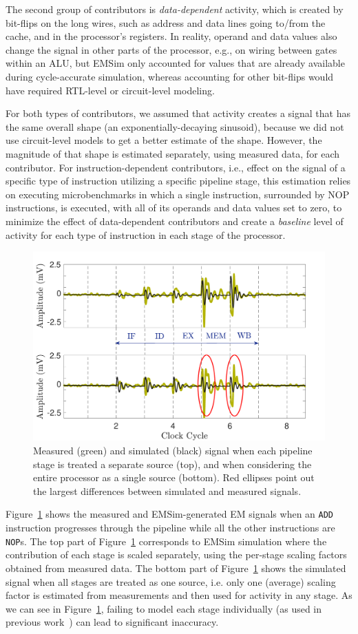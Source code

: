 The second group of contributors is \textit{data-dependent} activity, which is created by bit-flips on the long wires, such as address and data lines going to/from the cache, and in the processor's registers. In reality, operand and data values also change the signal in other parts of the processor, e.g., on wiring between gates within an ALU, but EMSim only accounted for values that are already available during cycle-accurate simulation, whereas accounting for other bit-flips would have required RTL-level or circuit-level modeling.

For both types of contributors, we assumed that activity creates a signal that has the same overall shape (an exponentially-decaying sinusoid), because we did not use circuit-level models to get a better estimate of the shape. However, the magnitude of that shape is estimated separately, using measured data, for each contributor. For instruction-dependent contributors, i.e., effect on the signal of a specific type of instruction utilizing a specific pipeline stage, this estimation relies on executing microbenchmarks in which a single instruction, surrounded by NOP instructions, is executed, with all of its operands and data values set to zero,
to minimize the effect of data-dependent contributors and create a \emph{baseline} level of activity for each type of instruction in each stage of the processor.

\begin{figure}
	\centering
\vspace{-0.2in}
	\includegraphics[width=0.45\columnwidth,clip]{figure/amp2.pdf}
\vspace{-0.3in}
	\caption{Measured (green) and simulated (black) signal when each pipeline stage is treated a separate source (top), and when considering the entire processor as a single source (bottom). Red ellipses point out the largest differences between simulated and measured signals.}
	\vspace{-0.1in}
	\label{fig:amp}
\end{figure}
Figure~\ref{fig:amp} shows the measured and EMSim-generated EM signals when an {\tt ADD} instruction progresses through the pipeline while all the other instructions are {\tt NOP}s. The top part of Figure~\ref{fig:amp} corresponds to EMSim simulation where the contribution of each stage is scaled separately, using the per-stage scaling factors obtained from measured data. The bottom part of Figure~\ref{fig:amp} shows the simulated signal when all stages are treated as one source, i.e. only one (average) scaling factor is estimated from measurements and then used for activity in any stage. As we can see in Figure~\ref{fig:amp}, failing to model each stage individually (as used in previous work~\cite{McCann:2017:TPT:3241189.3241207}) can lead to significant inaccuracy.

